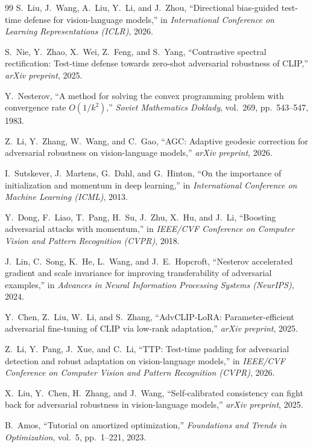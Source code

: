 \documentclass[12pt,a4paper]{article}
\begin{document}
\begin{thebibliography}{99}
S.~Liu, J.~Wang, A.~Liu, Y.~Li, and J.~Zhou,
``Directional bias-guided test-time defense for vision-language models,''
in \emph{International Conference on Learning Representations (ICLR)}, 2026.

S.~Nie, Y.~Zhao, X.~Wei, Z.~Feng, and S.~Yang,
``Contrastive spectral rectification: Test-time defense towards zero-shot adversarial robustness of CLIP,''
\emph{arXiv preprint}, 2025.

Y.~Nesterov,
``A method for solving the convex programming problem with convergence rate $O(1/k^2)$,''
\emph{Soviet Mathematics Doklady}, vol.~269, pp.~543--547, 1983.

Z.~Li, Y.~Zhang, W.~Wang, and C.~Gao,
``AGC: Adaptive geodesic correction for adversarial robustness on vision-language models,''
\emph{arXiv preprint}, 2026.

I.~Sutskever, J.~Martens, G.~Dahl, and G.~Hinton,
``On the importance of initialization and momentum in deep learning,''
in \emph{International Conference on Machine Learning (ICML)}, 2013.

Y.~Dong, F.~Liao, T.~Pang, H.~Su, J.~Zhu, X.~Hu, and J.~Li,
``Boosting adversarial attacks with momentum,''
in \emph{IEEE/CVF Conference on Computer Vision and Pattern Recognition (CVPR)}, 2018.

J.~Lin, C.~Song, K.~He, L.~Wang, and J.~E.~Hopcroft,
``Nesterov accelerated gradient and scale invariance for improving transferability of adversarial examples,''
in \emph{Advances in Neural Information Processing Systems (NeurIPS)}, 2024.

Y.~Chen, Z.~Liu, W.~Li, and S.~Zhang,
``AdvCLIP-LoRA: Parameter-efficient adversarial fine-tuning of CLIP via low-rank adaptation,''
\emph{arXiv preprint}, 2025.

Z.~Li, Y.~Pang, J.~Xue, and C.~Li,
``TTP: Test-time padding for adversarial detection and robust adaptation on vision-language models,''
in \emph{IEEE/CVF Conference on Computer Vision and Pattern Recognition (CVPR)}, 2026.

X.~Liu, Y.~Chen, H.~Zhang, and J.~Wang,
``Self-calibrated consistency can fight back for adversarial robustness in vision-language models,''
\emph{arXiv preprint}, 2025.

B.~Amos,
``Tutorial on amortized optimization,''
\emph{Foundations and Trends in Optimization}, vol.~5, pp.~1--221, 2023.


\end{thebibliography}
\end{document}
